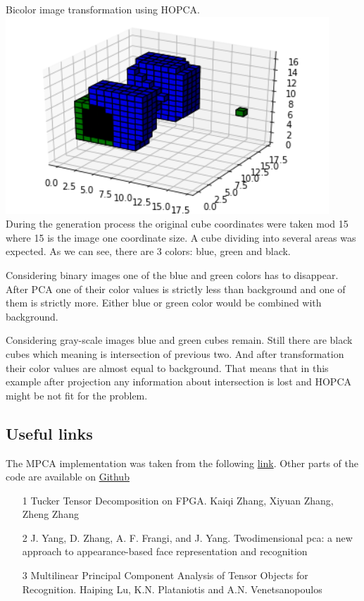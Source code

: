 \documentclass[12pt]{article}
\begin{document}
\newpage
Bicolor image transformation using HOPCA.\\
\includegraphics[scale=0.8]{figures/3.png}\\
During the generation process the original cube coordinates were taken mod 15 where 15 is the image one coordinate size. A cube dividing into several areas was expected. As we can see, there are 3 colors: blue, green and black.
\par 
Considering binary images one of the blue and green colors has to disappear. After PCA one of their color values is strictly less than 
background and one of them is strictly more. Either blue or green color would be combined with background.
\par 
Considering gray-scale images blue and green cubes remain. Still there are black cubes which meaning is intersection of previous two. And after transformation their color values are almost equal to background. That means that in this example after projection any information about intersection is lost and HOPCA might be not fit for the problem.   
\subsection{Useful links}
The MPCA implementation was taken from the following \href{https://www.mathworks.com/matlabcentral/fileexchange/26168-multilinear-principal-component-analysis-mpca?s_tid=mwa_osa_a}{link}. Other parts of the code are available on \href{https://github.com/PankratovViktor/MMP_Lab1}{Github}
\begin{itemize}
\item[1]{Tucker Tensor Decomposition on FPGA.
Kaiqi Zhang, Xiyuan Zhang, Zheng Zhang}
\item[2]{J. Yang, D. Zhang, A. F. Frangi, and J. Yang. Twodimensional pca: a new approach to appearance-based face
representation and recognition}
\item[3]{Multilinear Principal Component Analysis of Tensor Objects for Recognition.
Haiping Lu, K.N. Plataniotis and A.N. Venetsanopoulos
}
\end{itemize}
\end{document}
